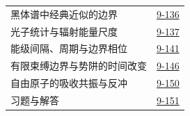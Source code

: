 \begin{longtable}{@{}p{}r@{}}
\hspace{1em}黑体谱中经典近似的边界&\href{course-page:9:140}{9-136}\\[2pt]
\hspace{1em}光子统计与辐射能量尺度&\href{course-page:9:141}{9-137}\\[2pt]
\hspace{1em}能级间隔、周期与边界相位&\href{course-page:9:145}{9-141}\\[2pt]
\hspace{1em}有限束缚边界与势阱的时间改变&\href{course-page:9:150}{9-146}\\[2pt]
\hspace{1em}自由原子的吸收共振与反冲&\href{course-page:9:154}{9-150}\\[2pt]
\hspace{1em}习题与解答&\href{course-page:9:155}{9-151}\\[2pt]
\end{longtable}
